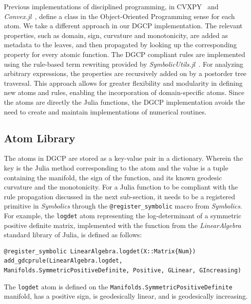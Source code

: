 \documentclass[twoside,11pt]{article}
\begin{document}
Previous implementations of disciplined programming, in CVXPY~\citep{diamond2016cvxpy} and \textsl{Convex.jl}~\citep{udell2014convex}, define a class in the Object-Oriented Programming %
sense for each atom. We take a different approach in our DGCP implementation. The relevant properties, such as domain, sign, curvature and monotonicity, are added as metadata to the leaves, and then propagated by looking up the corresponding property for every atomic function. The DGCP compliant rules are implemented using the rule-based term rewriting provided by \textsl{SymbolicUtils.jl}~\citep{symutils}. For analyzing arbitrary expressions, the properties are recursively added on by a postorder tree traversal. This approach allows for greater flexibility and modularity in defining new atoms and rules, enabling the incorporation of domain-specific atoms. Since the atoms are directly the Julia functions, the DGCP implementation avoids the need to create and maintain implementations of numerical routines.

\subsection{Atom Library}

The atoms in DGCP are stored as a key-value pair in a dictionary. Wherein the key is the Julia method corresponding to the atom and the value is a tuple containing the manifold, the sign of the function, and its known geodesic curvature and the monotonicity. For a Julia function to be compliant with the rule propagation discussed in the next sub-section, it needs to be a registered primitive in \textsl{Symbolics} through the \verb|@register_symbolic| macro from \textsl{Symbolics}.         
For example, the \texttt{logdet} atom representing the log-determinant of a symmetric positive definite matrix, implemented with the function from the \textsl{LinearAlgebra} standard library of Julia, is defined as follows:

\begin{listing}[h!]
\label{logdetatom}
\begin{verbatim}
@register_symbolic LinearAlgebra.logdet(X::Matrix{Num})
add_gdcprule(LinearAlgebra.logdet, Manifolds.SymmetricPositiveDefinite, Positive, GLinear, GIncreasing)
\end{verbatim}

\caption{The \texttt{logdet} atom is defined on the \texttt{Manifolds.SymmetricPositiveDefinite} manifold, has a positive sign, is geodesically linear, and is geodesically increasing.}

\end{listing}
\end{document}
